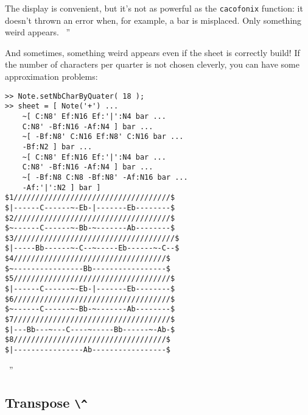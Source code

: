 \documentclass{article}
\newenvironment{meenv}{ \par \noindent \makebox[6em][r]{ \textcolor{mecolor}{Me}: `` --~}}{~''}
\newenvironment{myselfenv}{ \par \noindent \makebox[6em][r]{ \textcolor{myselfcolor}{Myself}: `` --~}}{~''}
\begin{document}
\begin{myselfenv}%
The display is convenient, but it's not as powerful as the \lstinline!cacofonix! function: it doesn't thrown an error when, for example, a bar is misplaced. Only something weird appears.%
\end{myselfenv}
\begin{meenv}%
And sometimes, something weird appears even if the sheet is correctly build! If the number of characters per quarter is not chosen cleverly, you can have some approximation problems:
\begin{lstlisting}
>> Note.setNbCharByQuater( 18 );
>> sheet = [ Note('+') ...
	~[ C:N8' Ef:N16 Ef:'|':N4 bar ...
	C:N8' -Bf:N16 -Af:N4 ] bar ...
	~[ -Bf:N8' C:N16 Ef:N8' C:N16 bar ...
	-Bf:N2 ] bar ...
	~[ C:N8' Ef:N16 Ef:'|':N4 bar ...
	C:N8' -Bf:N16 -Af:N4 ] bar ...
	~[ -Bf:N8 C:N8 -Bf:N8' -Af:N16 bar ...
	-Af:'|':N2 ] bar ]
$1////////////////////////////////////$
$|------C------~-Eb-|-------Eb--------$
$2////////////////////////////////////$
$~------C------~-Bb-~-------Ab--------$
$3/////////////////////////////////////$
$|-----Bb------~-C--~-----Eb------~-C--$
$4///////////////////////////////////$
$~----------------Bb-----------------$
$5////////////////////////////////////$
$|------C------~-Eb-|-------Eb--------$
$6////////////////////////////////////$
$~------C------~-Bb-~-------Ab--------$
$7////////////////////////////////////$
$|---Bb---~---C----~-----Bb------~-Ab-$
$8///////////////////////////////////$
$|----------------Ab-----------------$
\end{lstlisting}
\end{meenv}

\subsection{Transpose \lstinline!\^!}
\label{sec:Transpose}
\end{document}
